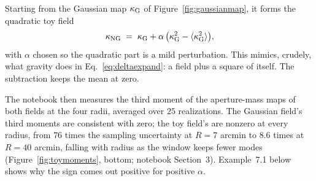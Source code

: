 \documentclass[11pt]{article}
\numberwithin{equation}{section}
\begin{document}
Starting from the Gaussian map $\kappa_{\rm G}$ of
Figure~\ref{fig:gaussianmap}, it forms the quadratic toy field
\begin{equation}
  \kappa_{\rm NG}
  \;=\; \kappa_{\rm G}
  + \alpha\,\bigl(\kappa_{\rm G}^2
  - \langle\kappa_{\rm G}^2\rangle\bigr),
  \label{eq:toyng}
\end{equation}
with $\alpha$ chosen so the quadratic part is a mild perturbation.
This mimics, crudely, what gravity does in
Eq.~\eqref{eq:deltaexpand}: a field plus a square of itself.  The
subtraction keeps the mean at zero.

The notebook then measures the third moment of the aperture-mass
maps of both fields at the four radii, averaged over $25$
realizations.  The Gaussian field's third moments are consistent
with zero; the toy field's are nonzero at every radius, from $76$
times the sampling uncertainty at $R = 7$ arcmin to $8.6$ times at
$R = 40$ arcmin, falling with radius as the window keeps fewer
modes (Figure~\ref{fig:toymoments}, bottom; notebook Section~3).
Example~7.1 below shows why the sign comes out positive for
positive $\alpha$.
\end{document}

